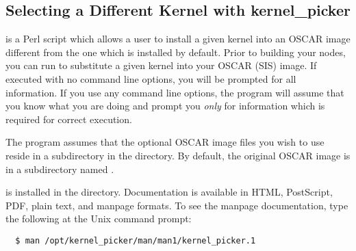 
\subsection{Selecting a Different Kernel with kernel\_picker}
\label{app:kernel-picker-overview}

 is a Perl script which allows a user to install a
given kernel into an OSCAR image different from the one which is
installed by default.  Prior to building your nodes, you can run
 to substitute a given kernel into your OSCAR
(SIS) image.  If executed with no command line options, you will be
prompted for all information.  If you use any command line options,
the program will assume that you know what you are doing and prompt
you {\em only} for information which is required for correct
execution.

The  program assumes that the optional OSCAR image
files you wish to use reside in a subdirectory in the
 directory.  By default, the
original OSCAR image is in a subdirectory named .

 is installed in the
 directory.  Documentation is available
in HTML, PostScript, PDF, plain text, and manpage formats.  To see the
manpage documentation, type the following at the Unix command prompt:

\begin{verbatim}
  $ man /opt/kernel_picker/man/man1/kernel_picker.1
\end{verbatim}

